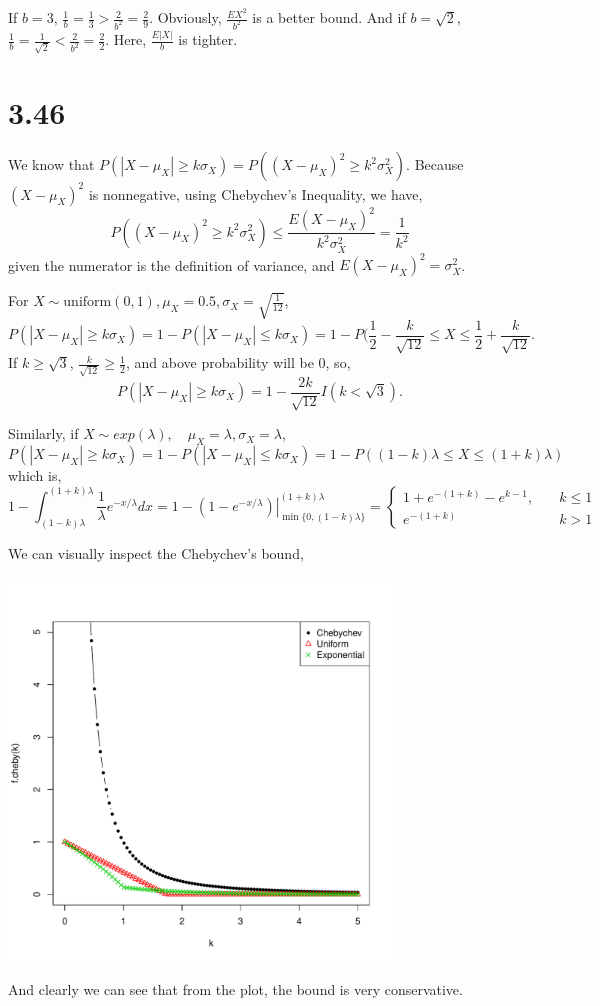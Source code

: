 \documentclass[letter]{article}
\begin{document}
   If $b=3$, $\frac{1}{b} = \frac{1}{3} > \frac{2}{b^2} = \frac{2}{9}$. Obviously, $\frac{EX^2}{b^2}$ is a better bound. And if $b = \sqrt{2}$, $\frac{1}{b} = \frac{1}{\sqrt{2}} < \frac{2}{b^2} = \frac{2}{2}$. Here, $\frac{E|X|}{b}$ is tighter.

   \section*{3.46}
    We know that $P(|X-\mu_X| \ge k\sigma_X) = P\left((X-\mu_X)^2 \ge k^2 \sigma_X^2\right)$. Because $(X-\mu_X)^2$ is nonnegative, using Chebychev's Inequality, we have,
    \[
    P\left((X-\mu_X)^2 \ge k^2 \sigma_X^2\right) \le \frac{E(X-\mu_X)^2}{k^2 \sigma_X^2} = \frac{1}{k^2}
    \]
    given the numerator is the definition of variance, and $E(X - \mu_X)^2 = \sigma_X^2$.

    For $X \sim \text{uniform}(0, 1), \mu_X = 0.5, \sigma_X = \sqrt{\frac{1}{12}}$, 
    \[
    P(|X-\mu_X| \ge k\sigma_X) = 1 - P(|X - \mu_X| \le k\sigma_X) = 1 - P(\frac{1}{2}-\frac{k}{\sqrt{12}} \le X \le \frac{1}{2} + \frac{k}{\sqrt{12}}.
    \]
    If $k \ge \sqrt{3}$, $\frac{k}{\sqrt{12}} \ge \frac{1}{2}$, and above probability will be 0, so,
    \[
    P(|X-\mu_X| \ge k\sigma_X) = 1-\frac{2k}{\sqrt{12}} I(k < \sqrt{3}).
    \]

    Similarly, if $X \sim exp(\lambda), \quad \mu_X = \lambda, \sigma_X = \lambda$, 
    \[
    P(|X-\mu_X| \ge k\sigma_X) = 1 - P(|X - \mu_X| \le k\sigma_X) = 1-P((1-k)\lambda \le X \le (1+k)\lambda)
    \]
    which is,
    \[
    1- \int_{(1-k)\lambda}^{(1+k)\lambda} \frac{1}{\lambda} e^{-x/\lambda} dx = 1-\left.\left( 1-e^{-x/\lambda} \right)\right|^{(1+k)\lambda}_{\min\{0, (1-k)\lambda\}} = 
    \begin{cases}
    1+e^{-(1+k)}-e^{k-1}, \quad & k \le 1 \\
    e^{-(1+k)} \quad & k > 1
    \end{cases}
    \]

    We can visually inspect the Chebychev's bound,
    
    \begin{center}
    \includegraphics[width=4in]{chebychev.pdf}
    \end{center}

    And clearly we can see that from the plot, the bound is very conservative. 
\end{document}
